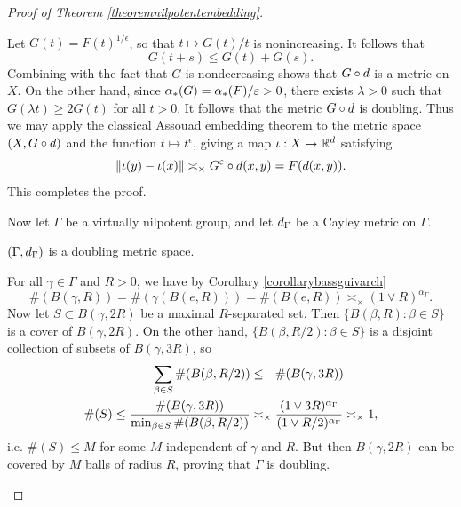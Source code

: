 \begin{proof}[Proof of Theorem \ref{theoremnilpotentembedding}]
\begin{subproof}
Let $G(t) = F(t)^{1/\epsilon}$, so that $t\mapsto G(t)/t$ is nonincreasing. It follows that
\[
G(t + s) \leq G(t) + G(s).
\]
Combining with the fact that $G$ is nondecreasing shows that $G\circ d$ is a metric on $X$. On the other hand, since $\alpha_*(G) = \alpha_*(F)/\varepsilon > 0$, there exists $\lambda > 0$ such that $G(\lambda t) \geq 2G(t)$ for all $t > 0$. It follows that the metric $G\circ d$ is doubling. Thus we may apply the classical Assouad embedding theorem to the metric space $(X,G\circ d)$ and the function $t\mapsto t^\epsilon$, giving a map $\iota:X\to \R^d$ satisfying
\[
\|\iota(y) - \iota(x)\| \asymp_\times G^\varepsilon \circ d(x,y) = F(d(x,y)).
\]
This completes the proof.
\end{subproof}

Now let $\Gamma$ be a virtually nilpotent group, and let $d_\Gamma$ be a Cayley metric on $\Gamma$.
\begin{lemma}
$(\Gamma,d_\Gamma)$ is a doubling metric space.
\end{lemma}
\begin{subproof}
For all $\gamma\in\Gamma$ and $R > 0$, we have by Corollary \ref{corollarybassguivarch}
\[
\#(B(\gamma,R)) = \#(\gamma(B(e,R))) = \#(B(e,R)) \asymp_\times (1\vee R)^{\alpha_\Gamma}.
\]
Now let $S\subset B(\gamma,2R)$ be a maximal $R$-separated set. Then $\{B(\beta,R) : \beta\in S\}$ is a cover of $B(\gamma,2R)$. On the other hand, $\{B(\beta,R/2) : \beta\in S\}$ is a disjoint collection of subsets of $B(\gamma,3R)$, so
\begin{align*}
\sum_{\beta\in S}\#(B(\beta,R/2)) &\leq_\pt \#(B(\gamma,3R))\\
\#(S) \leq \frac{\#(B(\gamma,3R))}{\min_{\beta\in S}\#(B(\beta,R/2))}
&\asymp_\times \frac{(1\vee 3R)^{\alpha_\Gamma}}{(1\vee R/2)^{\alpha_\Gamma}} \asymp_\times 1,
\end{align*}
i.e. $\#(S) \leq M$ for some $M$ independent of $\gamma$ and $R$. But then $B(\gamma,2R)$ can be covered by $M$ balls of radius $R$, proving that $\Gamma$ is doubling.
\end{subproof}


\end{proof}
